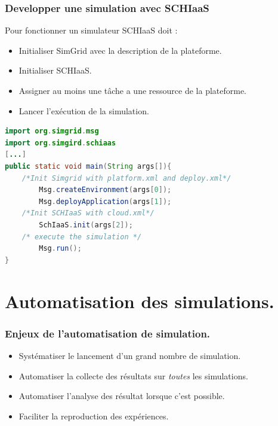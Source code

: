 \documentclass{beamer}
\begin{document}

\begin{frame}[fragile]
	\frametitle{Developper une simulation avec SCHIaaS}
	Pour fonctionner un simulateur SCHIaaS doit :
	\begin{itemize}
		\item Initialiser SimGrid avec la description de la plateforme.
		\item Initialiser SCHIaaS.
		\item Assigner au moins une tâche a une ressource de la plateforme.
		\item Lancer l'exécution de la simulation.
	\end{itemize}
	\begin{lstlisting}[basicstyle=\footnotesize,language=Java,
	backgroundcolor=\color{gray!10},
	commentstyle=\color{red!90}
	]
import org.simgrid.msg
import org.simgird.schiaas
[...]
public static void main(String args[]){
    /*Init Simgrid with platform.xml and deploy.xml*/
        Msg.createEnvironment(args[0]);
        Msg.deployApplication(args[1]);
    /*Init SCHIaaS with cloud.xml*/
        SchIaaS.init(args[2]);
    /* execute the simulation */
        Msg.run();
}
\end{lstlisting}

\end{frame}

\section{Automatisation des simulations.}

\begin{frame}
	\frametitle{Enjeux de l'automatisation de simulation.}
	\begin{itemize}
		\item Systématiser le lancement d'un grand nombre de simulation.
		\item Automatiser la collecte des résultats sur \emph{toutes} 
			les simulations.
		\item Automatiser l'analyse des résultat lorsque c'est possible.
		\item Faciliter la reproduction des expériences. 
	\end{itemize}
\end{frame}
\end{document}
